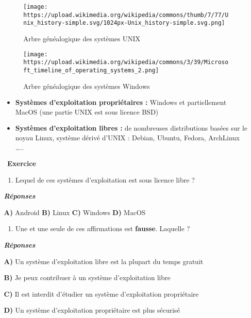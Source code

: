 \documentclass[
  11pt,
]{article}
\providecommand{\tightlist}{%
  \setlength{\itemsep}{0pt}\setlength{\parskip}{0pt}}
\newcounter{exo}
\newenvironment{exercice}[1]
{\par \medskip   \addtocounter{exo}{1} \noindent  
\begin{bclogo}[arrondi =0.1,   noborder = true, logo=\bccrayon, marge=4]{~\textbf{Exercice} \textbf{\theexo} {\itshape #1} }  \par}
{
\end{bclogo}
 \par \bigskip }
\newcounter{prop}
\newcounter{def}
\newcounter{logi}
\newcounter{histo}
\begin{document}
\begin{figure}
\centering
\texttt{[image: https://upload.wikimedia.org/wikipedia/commons/thumb/7/77/Unix\_history-simple.svg/1024px-Unix\_history-simple.svg.png]}
\caption{Arbre généalogique des systèmes UNIX}
\end{figure}

\begin{figure}
\centering
\texttt{[image: https://upload.wikimedia.org/wikipedia/commons/3/39/Microsoft\_timeline\_of\_operating\_systems\_2.png]}
\caption{Arbre généalogique des systèmes Windows}
\end{figure}

\begin{itemize}
\item
  \textbf{Systèmes d'exploitation propriétaires :} Windows et
  partiellement MacOS (une partie UNIX est sous licence BSD)
\item
  \textbf{Systèmes d'exploitation libres :} de nombreuses distributions
  basées sur le noyau Linux, système dérivé d'UNIX : Debian, Ubuntu,
  Fedora, ArchLinux \ldots..
\end{itemize}

\begin{exercice}{}

\begin{enumerate}
\def\labelenumi{\arabic{enumi}.}
\tightlist
\item
  Lequel de ces systèmes d'exploitation est sous licence libre ?
\end{enumerate}

\textbf{\emph{Réponses}}

\textbf{A)} Android \textbf{B)} Linux \textbf{C)} Windows \textbf{D)}
MacOS

\begin{enumerate}
\def\labelenumi{\arabic{enumi}.}
\setcounter{enumi}{1}
\tightlist
\item
  Une et une seule de ces affirmations est \textbf{fausse}. Laquelle ?
\end{enumerate}

\textbf{\emph{Réponses}}

\textbf{A)} Un système d'exploitation libre est la plupart du temps
gratuit

\textbf{B)} Je peux contribuer à un système d'exploitation libre

\textbf{C)} Il est interdit d'étudier un système d'exploitation
propriétaire

\textbf{D)} Un système d'exploitation propriétaire est plus sécurisé

\end{exercice}
\end{document}
